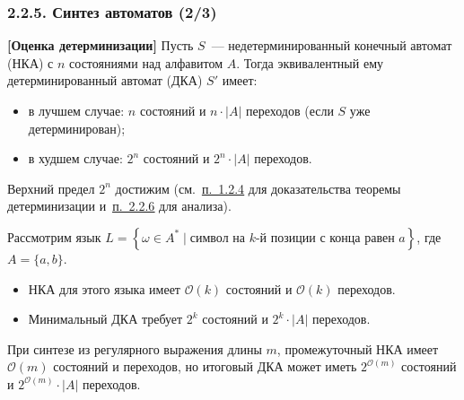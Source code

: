 \documentclass[mathserif,12pt,aspectratio=169]{beamer}
\def\NB#1{{\bf\color{brown}#1}}
\def\Set#1#2{\left\{ #1 \mid #2 \right\}}
\let\cal\mathcal
\def\DMref#1#2{{\color{blue}\underline{\hyperlink{#2}{#1}}}}
\begin{document}
\begin{frame}
\frametitle{2.2.5. Синтез автоматов (2/3)}
\begin{theorem} \NB{[Оценка детерминизации]}
Пусть $S$~--- недетерминированный конечный автомат (НКА) с $n$ состояниями над алфавитом $A$.
Тогда эквивалентный ему детерминированный автомат (ДКА) $S'$ имеет:
\begin{itemize}
    \item в лучшем случае: $n$ состояний и $n \cdot |A|$ переходов (если $S$ уже детерминирован);
    \item в худшем случае: $2^n$ состояний и $2^n \cdot |A|$ переходов.
\end{itemize}
\end{theorem}
Верхний предел $2^n$ достижим (см.~\DMref{п.~1.2.4}{1.2.4.} для доказательства теоремы детерминизации 
и~\DMref{п.~2.2.6}{2.2.6.} для анализа).

\begin{example}
Рассмотрим язык $L=\Set{\omega \in A^*}{\text{символ на } k \text{-й позиции с конца равен } a}$, где $A=\{a,b\}$.
\begin{itemize}
    \item НКА для этого языка имеет $\cal{O}(k)$ состояний и $\cal{O}(k)$ переходов.
     
    \item Минимальный ДКА требует $2^k$ состояний и $2^k \cdot |A|$ переходов.
\end{itemize}
\end{example}
\begin{remark}
При синтезе из регулярного выражения длины $m$, промежуточный НКА имеет $\cal{O}(m)$ состояний и переходов, 
но итоговый ДКА может иметь $2^{\cal{O}(m)}$ состояний и $2^{\cal{O}(m)} \cdot |A|$ переходов.
\end{remark}
\end{frame}
\end{document}
